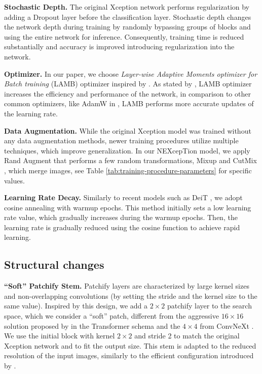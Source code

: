 \textbf{Stochastic Depth.}
The original Xception network performs regularization by adding a Dropout layer before the classification layer.
Stochastic depth \citep{HuangSun2016} changes the network depth during training by randomly bypassing groups of blocks and using the entire network for inference. Consequently, training time is reduced substantially and accuracy is improved introducing regularization into the network.

\textbf{Optimizer.}
In our paper, we choose \textit{Layer-wise Adaptive Moments optimizer for Batch training} (LAMB) optimizer inspired by \citet{YouEtAl2019}. As stated by \citet{WigEtAl2021}, LAMB optimizer increases the efficiency and performance of the network, in comparison to other common optimizers, like AdamW in \citet{LiuEtAl2022}, LAMB performs more accurate updates of the learning rate.


\textbf{Data Augmentation.}
While the original Xception model was trained without any data augmentation methods, newer training procedures utilize multiple techniques, which improve generalization. In our NEXcepTion model, we apply Rand Augment \citep{CubEtAl2019} that performs a few random transformations, Mixup \citep{ZhaEtAl2018} and CutMix \citep{YunEtAl2019}, which merge images, see Table \ref{tab:training-procedure-parameters} for specific values.

\textbf{Learning Rate Decay.}
Similarly to recent models such as DeiT \citep{TouEtAl2020}, we adopt cosine annealing \citep{LosEtAl2018} with warmup epochs. 
This method initially sets a low learning rate value, which gradually increases during the warmup epochs. Then, the learning rate is gradually reduced using the cosine function to achieve rapid learning. 

\subsection{Structural changes}
\textbf{``Soft'' Patchify Stem.}
Patchify layers are characterized by large kernel sizes and non-overlapping convolutions (by setting the stride and the kernel size to the same value). Inspired by this design, we add a $2\times2$ patchify layer to the search space, which we consider a ``soft'' patch, different from the aggressive $16\times16$ solution proposed by \citet{DosEtAl2020} in the Transformer schema and the $4\times4$ from ConvNeXt \citep{LiuEtAl2022}.
We use the initial block with kernel $2\times2$ and stride 2 to match the original Xception network and to fit the output size. 
This stem is adapted to the reduced resolution of the input images, similarly to the efficient configuration introduced by \citet{CorEtAl2019}.

